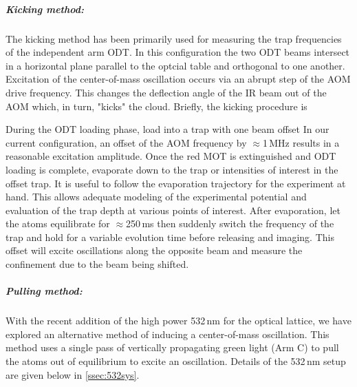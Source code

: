 \subparagraph{Kicking method:}
The kicking method has been primarily used for measuring the trap frequencies of the independent arm ODT.
In this configuration the two ODT beams  intersect in a horizontal plane parallel to the optcial table and orthogonal to one another.
Excitation of the center-of-mass oscillation occurs via an abrupt step of the AOM drive frequency.
This changes the deflection angle of the IR beam out of the AOM which, in turn, "kicks" the cloud.
Briefly, the kicking procedure is 
\begin{outline}[enumerate]
	\1 During the ODT loading phase, load into a trap with one beam offset
		\2 In our current configuration, an offset of the AOM frequency by $\approx$1\,MHz results in a reasonable excitation amplitude.
	\1 Once the red MOT is extinguished and ODT loading is complete, evaporate down to the trap or intensities of interest in the offset trap.
		\2 It is useful to follow the evaporation trajectory for the experiment at hand. This allows adequate modeling of the experimental potential and evaluation of the trap depth at various points of interest.
	\1 After evaporation, let the atoms equilibrate for $\approx$250\,ms then suddenly switch the frequency of the trap and hold for a variable evolution time before releasing and imaging.
		\2 This offset will excite oscillations along the opposite beam and measure the confinement due to the beam being shifted.
\end{outline}

\subparagraph{Pulling method:}
With the recent addition of the high power 532\,nm for the optical lattice, we have explored an alternative method of inducing a center-of-mass oscillation. 
This method uses a single pass of vertically propagating green light (Arm C) to pull the atoms out of equilibrium to excite an oscillation.
Details of the 532\,nm setup are given below in \ref{ssec:532sys}.

